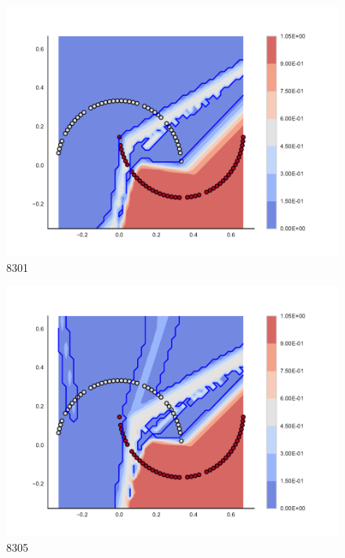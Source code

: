 \begin{subfigure}[b]{0.09\textwidth}
    \includegraphics[clip, trim=2.35cm 1.75cm 4.5cm 0cm,width=\textwidth]{img/convergence/8301.pdf}
    \caption{8301}
    \label{fig:convergence_8301}
\end{subfigure}
%
\begin{subfigure}[b]{0.09\textwidth}
    \includegraphics[clip, trim=2.35cm 1.75cm 4.5cm 0cm,width=\textwidth]{img/convergence/8305.pdf}
    \caption{8305}
    \label{fig:convergence_8305}
\end{subfigure}
%
